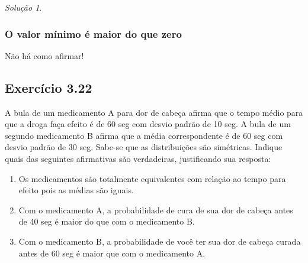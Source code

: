 \documentclass[
]{latex/krantz}
\providecommand{\tightlist}{%
  \setlength{\itemsep}{0pt}\setlength{\parskip}{0pt}}
\theoremstyle{definition}
\theoremstyle{definition}
\theoremstyle{definition}
\theoremstyle{definition}
\theoremstyle{remark}
\newtheorem*{solution}{Solução}
\begin{document}
\begin{solution}
\hypertarget{o-valor-muxednimo-uxe9-maior-do-que-zero}{%
\subsubsection*{O valor mínimo é maior do que zero}\label{o-valor-muxednimo-uxe9-maior-do-que-zero}}

Não há como afirmar!

\end{solution}

\hypertarget{exr3-22}{%
\subsection*{Exercício 3.22}\label{exr3-22}}

A bula de um medicamento A para dor de cabeça afirma que o tempo médio para que a droga faça efeito é de 60 seg com desvio padrão de 10 seg. A bula de um segundo medicamento B afirma que a média correspondente é de 60 seg com desvio padrão de 30 seg. Sabe-se que as distribuições são simétricas. Indique quais das seguintes afirmativas são verdadeiras, justificando sua resposta:

\begin{enumerate}
\def\labelenumi{\alph{enumi})}
\tightlist
\item
  Os medicamentos são totalmente equivalentes com relação ao tempo para efeito pois as médias são iguais.
\item
  Com o medicamento A, a probabilidade de cura de sua dor de cabeça antes de 40 seg é maior do que com o medicamento B.
\item
  Com o medicamento B, a probabilidade de você ter sua dor de cabeça curada antes de 60 seg é maior que com o medicamento A.
\end{enumerate}
\end{document}
